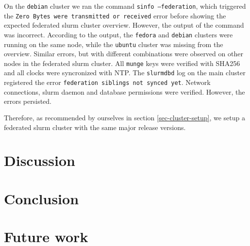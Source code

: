 \documentclass[conference]{IEEEtran}
\begin{document}
On the \texttt{debian} cluster we ran the command \texttt{sinfo --federation}, which triggered the \texttt{Zero Bytes were transmitted or received} error before showing the expected federated \gls{slurm} cluster overview. However, the output of the command was incorrect. According to the output, the \texttt{fedora} and \texttt{debian} clusters were running on the same node, while the \texttt{ubuntu} cluster was missing from the overview. Similar errors, but with different combinations were observed on other nodes in the federated \gls{slurm} cluster. All \texttt{munge} keys were verified with SHA256 and all clocks were syncronized with NTP. The \texttt{slurmdbd} log on the main cluster registered the error \texttt{federation siblings not synced yet}. Network connections, \gls{slurm} daemon and database permissions were verified. However, the errors persisted.

Therefore, as recommended by ourselves in section \ref{sec-cluster-setup}, we setup a federated \gls{slurm} cluster with the same major release versions.








\section{Discussion}




\section{Conclusion}


\section{Future work}









\end{document}
